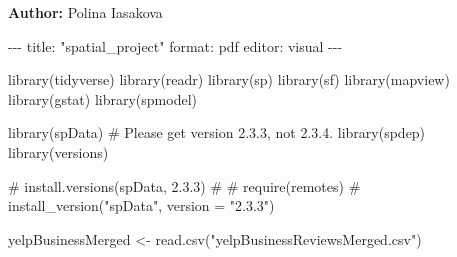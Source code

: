 \documentclass[
  12pt,
  letterpaper,
  DIV=11,
  numbers=noendperiod]{scrartcl}
\newenvironment{Shaded}{\begin{snugshade}}{\end{snugshade}}
\newcommand{\AttributeTok}[1]{\textcolor[rgb]{0.98,0.46,0.51}{#1}}
\newcommand{\CommentTok}[1]{\textcolor[rgb]{0.42,0.45,0.49}{#1}}
\newcommand{\FunctionTok}[1]{\textcolor[rgb]{0.70,0.57,0.94}{#1}}
\newcommand{\KeywordTok}[1]{\textcolor[rgb]{0.98,0.46,0.51}{#1}}
\newcommand{\NormalTok}[1]{\textcolor[rgb]{0.88,0.89,0.91}{#1}}
\newcommand{\OtherTok}[1]{\textcolor[rgb]{0.70,0.57,0.94}{#1}}
\newcommand{\PreprocessorTok}[1]{\textcolor[rgb]{0.98,0.46,0.51}{#1}}
\newcommand{\StringTok}[1]{\textcolor[rgb]{0.62,0.80,1.00}{#1}}
\begin{document}
\textbf{Author:} Polina Iasakova

\begin{Shaded}
\begin{Highlighting}[]
\PreprocessorTok{{-}{-}{-}}
\FunctionTok{title}\KeywordTok{:}\AttributeTok{ }\StringTok{"spatial\_project"}
\FunctionTok{format}\KeywordTok{:}\AttributeTok{ pdf}
\FunctionTok{editor}\KeywordTok{:}\AttributeTok{ visual}
\PreprocessorTok{{-}{-}{-}}
\end{Highlighting}
\end{Shaded}

\begin{Shaded}
\begin{Highlighting}[]
\FunctionTok{library}\NormalTok{(tidyverse)}
\FunctionTok{library}\NormalTok{(readr)}
\FunctionTok{library}\NormalTok{(sp) }
\FunctionTok{library}\NormalTok{(sf) }
\FunctionTok{library}\NormalTok{(mapview)}
\FunctionTok{library}\NormalTok{(gstat) }
\FunctionTok{library}\NormalTok{(spmodel)}

\FunctionTok{library}\NormalTok{(spData) }\CommentTok{\# Please get version 2.3.3, not 2.3.4.}
\FunctionTok{library}\NormalTok{(spdep)}
\FunctionTok{library}\NormalTok{(versions)}
\end{Highlighting}
\end{Shaded}

\begin{Shaded}
\begin{Highlighting}[]
\CommentTok{\# install.versions(\textquotesingle{}spData\textquotesingle{}, \textquotesingle{}2.3.3\textquotesingle{}) }
\CommentTok{\# }
\CommentTok{\# require(remotes)}
\CommentTok{\# install\_version("spData", version = "2.3.3")}
\end{Highlighting}
\end{Shaded}

\begin{Shaded}
\begin{Highlighting}[]
\NormalTok{yelpBusinessMerged }\OtherTok{\textless{}{-}} \FunctionTok{read.csv}\NormalTok{(}\StringTok{"yelpBusinessReviewsMerged.csv"}\NormalTok{)}
\end{Highlighting}
\end{Shaded}
\end{document}
